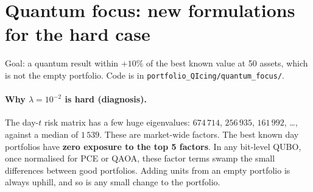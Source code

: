 \documentclass[11pt]{article}
\begin{document}
\section{Quantum focus: new formulations for the hard case}\label{sec:qfocus}
Goal: a quantum result within $+10\%$ of the best known value at 50 assets, which is not the empty
portfolio. Code is in \texttt{portfolio\_QIcing/quantum\_focus/}.

\paragraph{Why $\lambda=10^{-2}$ is hard (diagnosis).} The day-$t$ risk matrix has a few huge
eigenvalues: $674\,714$, $256\,935$, $161\,992$, \dots, against a median of $1\,539$. These are
market-wide factors. The best known day portfolios have \textbf{zero exposure to the top 5 factors}.
In any bit-level QUBO, once normalised for PCE or QAOA, these factor terms swamp the small differences
between good portfolios. Adding units from an empty portfolio is always uphill, and so is any small
change to the portfolio.
\end{document}
